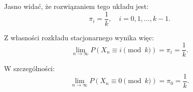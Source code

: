 Jasno widać, że rozwiązaniem tego układu jest:
\[
	\pi_i = \frac{1}{k}, \quad i = 0,1,\dots,k-1.
\]

Z własności rozkładu stacjonarnego wynika więc:
\[
	\lim_{n \to \infty} P(X_n \equiv i \pmod{k}) = \pi_i =  \frac{1}{k}.
\]

W szczególności:
\[
	\lim_{n \to \infty} P(X_n \equiv 0 \pmod{k}) = \pi_0 = \frac{1}{k}.
\]